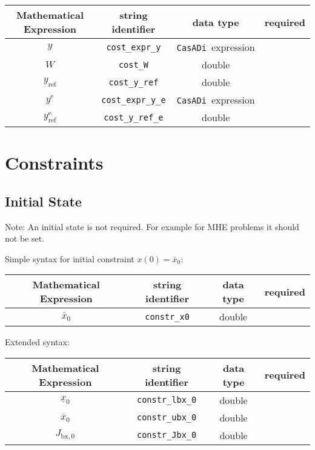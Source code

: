 \documentclass{article}
\newcommand{\code}[1]{\texttt{#1}}
\newcommand{\casadi}{\texttt{CasADi}}
\newcommand{\terminal}{^{\textrm{e}}}
\begin{document}
\begin{table}[h!]
	\centering
	\begin{tabular}{|c|c|c|c|}
		\toprule
		Mathematical Expression & string identifier & data type & required \\ \midrule
		$ y $ & \code{cost\_expr\_y}    & \casadi~expression  & \mandatory   \\ \midrule
		$ W $ & \code{cost\_W}    & double  & \mandatory   \\ \midrule
		$ y_{\textrm{ref}} $ & \code{cost\_y\_ref}    & double & \mandatory    \\ \midrule
		$ y\terminal $ & \code{cost\_expr\_y\_e}    & \casadi~expression  & \mandatory   \\ \midrule
		$ y_{\textrm{ref}}\terminal $ & \code{cost\_y\_ref\_e}    & double  & \mandatory   \\
		\bottomrule
	\end{tabular}
\end{table}
\section{Constraints}
\subsection{Initial State}
Note: An initial state is not required.
For example for MHE problems it should not be set.

Simple syntax for initial constraint $x(0)=\bar{x}_0$:
\begin{table}[h]
	\centering
	\begin{tabular}{|c|c|c|c|}
		\toprule
		Mathematical Expression & string identifier & data type & required \\ \midrule
		$ \bar{x}_0 $ & \code{constr\_x0} & double & \optional \\ 		\bottomrule
	\end{tabular}
\end{table}

Extended syntax:
\begin{table}[h]
	\centering
	\begin{tabular}{|c|c|c|c|}
		\toprule
		Mathematical Expression & string identifier & data type & required \\ \midrule
		$ \underline{x}_0 $ & \code{constr\_lbx\_0} & double & \optional \\ 		\bottomrule
		$ \bar{x}_0 $ & \code{constr\_ubx\_0} & double & \optional \\ 		\bottomrule
		$ J_{\textrm{bx},0} $ & \code{constr\_Jbx\_0} & double & \optional \\ 		\bottomrule
	\end{tabular}
\end{table}
\end{document}
